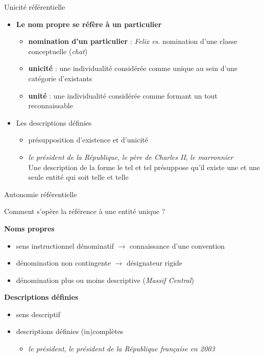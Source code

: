 \documentclass[xetex,xcolor={table,usenames,dvipsnames}]{beamer}
\newcommand{\bolder}[1]{{\color{purple}\bfseries#1}}
\begin{document}
\begin{frame}{Unicité référentielle}
	\begin{itemize}
		\item \bolder{Le nom propre se réfère à un particulier}
		\begin{itemize}
			\item \textcolor{deepblue}{\textbf{nomination d'un particulier}} : \textit{Felix} \textit{vs.} nomination d'une classe conceptuelle (\textit{chat})
			\item \textcolor{deepblue}{\textbf{unicité}} : une individualité considérée comme unique au sein d'une catégorie d'existants
			\item \textcolor{deepblue}{\textbf{unité}} : une individualité considérée comme formant un tout reconnaissable
		\end{itemize} 
		\item Les descriptions définies
		\begin{itemize}
			\item présupposition d'existence et d'unicité
			\item \textit{le président de la République}, \textit{le père de Charles II}, \textit{le marronnier}\\
			Une description de la forme \og{}le tel et tel\fg{} présuppose qu'il existe une et une seule entité qui soit telle et telle
		\end{itemize}
	\end{itemize}
\end{frame}

\begin{frame}{Autonomie référentielle}
	\begin{block}{\vspace{-0.6cm}}
		\justifying Comment s'opère la référence à une entité unique ?
	\end{block}
	
	
	\textcolor{deepblue}{\textbf{Noms propres}}
	\begin{itemize}
		\item sens instructionnel dénominatif $\rightarrow$ connaissance d'une convention
		\item dénomination non contingente $\rightarrow$ désignateur rigide
		\item dénomination plus ou moins descriptive (\textit{Massif Central})
	\end{itemize}
	
	\textcolor{deepblue}{\textbf{Descriptions définies}}
	\begin{itemize}
		\item sens descriptif
		\item descriptions définies (in)complètes
		\begin{itemize}
			\item \textit{le président}, \textit{le président de la République française en 2003}
		\end{itemize}
	\end{itemize}
\end{frame}
\end{document}
